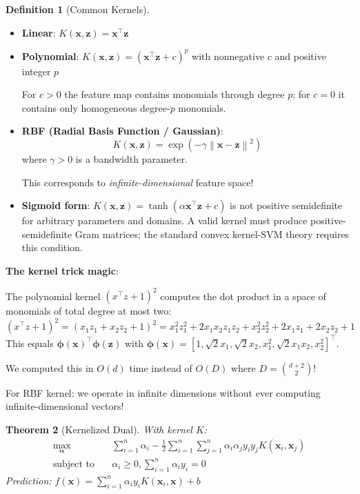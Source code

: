 \documentclass[11pt,twoside]{article}
\numberwithin{equation}{section}
\newcommand{\vect}[1]{\bm{#1}}
\newcommand{\norm}[1]{\left\lVert#1\right\rVert}
\theoremstyle{plain}
\newtheorem{theorem}{Theorem}[section]
\theoremstyle{definition}
\newtheorem{definition}[theorem]{Definition}
\theoremstyle{remark}
\newenvironment{keyidea}{
  \begin{tcolorbox}[colback=yellow!5!white,
                    colframe=yellow!50!black,
                    title=Key Idea,
                    breakable,
                    enhanced,
                    sharp corners,
                    boxrule=0.8pt,
                    left=6pt, right=6pt, top=6pt, bottom=6pt]
}{
  \end{tcolorbox}
}
\begin{document}
\begin{definition}[Common Kernels]
\begin{itemize}
\item \textbf{Linear}: $K(\vect{x}, \vect{z}) = \vect{x}^\top\vect{z}$

\item \textbf{Polynomial}: $K(\vect{x},\vect{z})=(\vect{x}^\top\vect{z}+c)^p$ with nonnegative $c$ and positive integer $p$

For $c>0$ the feature map contains monomials through degree $p$; for $c=0$ it contains only homogeneous degree-$p$ monomials.

\item \textbf{RBF (Radial Basis Function / Gaussian)}: 
\[
K(\vect{x}, \vect{z}) = \exp\left(-\gamma\norm{\vect{x} - \vect{z}}^2\right)
\]
where $\gamma > 0$ is a bandwidth parameter.

This corresponds to \emph{infinite-dimensional} feature space!

\item \textbf{Sigmoid form}: $K(\vect{x},\vect{z})=\tanh(\alpha\vect{x}^\top\vect{z}+c)$ is not positive semidefinite for arbitrary parameters and domains. A valid kernel must produce positive-semidefinite Gram matrices; the standard convex kernel-SVM theory requires this condition.
\end{itemize}
\end{definition}

\begin{keyidea}
\textbf{The kernel trick magic}:

The polynomial kernel $(x^\top z + 1)^2$ computes the dot product in a space of monomials of total degree at most two:
\[
(x^\top z + 1)^2 = (x_1z_1 + x_2z_2 + 1)^2 = x_1^2z_1^2 + 2x_1x_2z_1z_2 + x_2^2z_2^2 + 2x_1z_1 + 2x_2z_2 + 1
\]
This equals $\vect{\phi}(\vect{x})^\top\vect{\phi}(\vect{z})$ with $\vect{\phi}(\vect{x}) = [1, \sqrt{2}x_1, \sqrt{2}x_2, x_1^2, \sqrt{2}x_1x_2, x_2^2]^\top$.

We computed this in $O(d)$ time instead of $O(D)$ where $D=\binom{d+2}{2}$!

For RBF kernel: we operate in infinite dimensions without ever computing infinite-dimensional vectors!
\end{keyidea}

\begin{theorem}[Kernelized Dual]
With kernel $K$:
\[
\begin{aligned}
\max_{\vect{\alpha}} \quad & \sum_{i=1}^n \alpha_i - \frac{1}{2}\sum_{i=1}^n\sum_{j=1}^n \alpha_i\alpha_j y_i y_j K(\vect{x}_i, \vect{x}_j) \\
\text{subject to} \quad & \alpha_i \geq 0, \sum_{i=1}^n \alpha_i y_i = 0
\end{aligned}
\]
Prediction: $f(\vect{x}) = \sum_{i=1}^n \alpha_i y_i K(\vect{x}_i, \vect{x}) + b$
\end{theorem}
\end{document}
